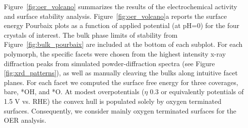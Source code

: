 Figure~\ref{fig:oer_volcano} summarizes the results of the electrochemical activity and surface stability analysis.
%
Figure~\ref{fig:oer_volcano}a reports the surface energy Pourbaix plots as a function of applied potential (at pH\num{=0}) for the four \IrOx crystals of interest.
%
The bulk phase limits of stability from Figure~\ref{fig:bulk_pourbaix} are included at the bottom of each subplot.
%
For each polymorph, the specific facets were chosen from the highest intensity x-ray diffraction peaks from simulated powder-diffraction spectra\cite{Momma2011} (see Figure \ref{fig:xrd_patterns}),
as well as manually cleaving the bulks along intuitive facet planes.
%
For each facet we computed the surface free energy for three coverages, bare, *OH, and *O.
%
At modest overpotentials ($\eta$ \mytilde\num{0.3} or equivalently potentials of \mytilde\num{1.5} V vs. RHE) the convex hull is populated solely by oxygen terminated surfaces.
%
Consequently, we consider mainly oxygen terminated surfaces for the OER analysis.

